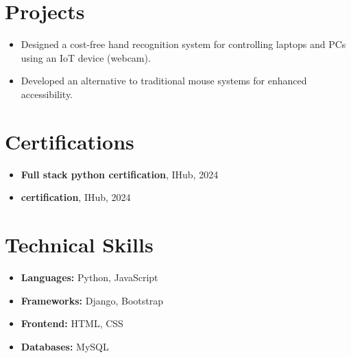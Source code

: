 \documentclass[12pt, a4paper, margin=0.8in]{article}
\begin{document}
\section{Projects}

\begin{itemize}
    \item Designed a cost-free hand recognition system for controlling laptops and PCs using an IoT device (webcam).
    \item Developed an alternative to traditional mouse systems for enhanced accessibility.
\end{itemize}



\section{Certifications}
\begin{itemize}
    \item \textbf{Full stack python certification}, IHub, 2024
    \item \textbf{ certification}, IHub, 2024
\end{itemize}

\section{Technical Skills}
\begin{multicols}{2}
\begin{minipage}{0.6\textwidth}
    \begin{itemize}
        \item \textbf{Languages:} Python, JavaScript
        \item \textbf{Frameworks:} Django, Bootstrap
    \end{itemize}
\end{minipage}%
\hfill%
\begin{minipage}{0.4\textwidth}
    \begin{itemize}
        \item \textbf{Frontend:} HTML, CSS
        \item \textbf{Databases:} MySQL
    \end{itemize}
\end{minipage}
\end{multicols}
\end{document}
